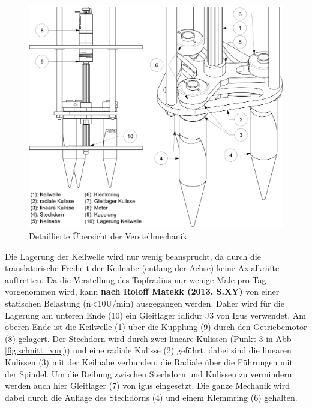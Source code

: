 	\begin{figure}[H]
	\includegraphics[scale=0.6]{Illustrationen/6-Umsetzung/details_vm.jpg}
	\caption{Detaillierte Übersicht der Verstellmechanik}
	\label{fig:details_vm}
	\end{figure}
Die Lagerung der Keilwelle wird nur wenig beansprucht, da durch die translatorische Freiheit der Keilnabe (entlang der Achse) keine Axialkräfte auftretten. Da die Verstellung des Topfradius nur wenige Male pro Tag vorgenommen wird, kann \textbf{nach Roloff Matekk (2013, S.XY)} von einer statischen Belastung (n<10U/min) ausgegangen werden. Daher wird für die Lagerung am unteren Ende (10) ein Gleitlager idlidur J3 von Igus verwendet. Am oberen Ende ist die Keilwelle (1) über die Kupplung (9) durch den Getriebemotor (8) gelagert.
\newline
\newline
Der Stechdorn wird durch zwei lineare Kulissen (Punkt 3 in Abb \ref{fig:schnitt_vm})) und eine radiale Kulisse (2) geführt. dabei sind die linearen Kulissen (3) mit der Keilnabe verbunden, die Radiale über die Führungen mit der Spindel. Um die Reibung zwischen Stechdorn und Kulissen zu vermindern werden auch hier Gleitlager (7) von igus eingesetzt. Die ganze Mechanik wird dabei durch die Auflage des Stechdorns (4) und einem Klemmring (6) gehalten.
